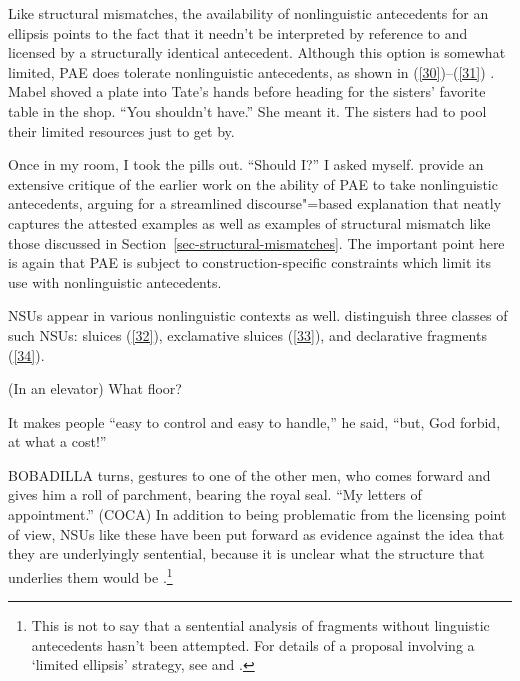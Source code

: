 {Like structural mismatches, the availability of nonlinguistic antecedents for an ellipsis points to the fact that it needn't be interpreted by reference to and licensed by a structurally identical antecedent. Although this option is somewhat limited, PAE does tolerate nonlinguistic antecedents, as shown in (\ref{30})--(\ref{31}) \citep[see also][]{Hankamer1976, Schachter1977}.
\ea Mabel shoved a plate into Tate's hands before heading for the sisters' favorite table in the shop. ``You shouldn't have.'' She meant it. The sisters had to pool their limited resources
just to get by. \citep[ex. 23][]{Miller2014b}\label{30}\z

\ea Once in my room, I took the pills out. ``Should I?'' I asked myself. \citep[ex. 22a][]{Miller2014b}\label{31}\z
\citet{Miller2014b} provide an extensive critique of the earlier work on the ability of PAE to take nonlinguistic antecedents, arguing for a streamlined discourse"=based explanation that neatly captures the attested examples as well as examples of structural mismatch like those discussed in Section~\ref{sec-structural-mismatches}. The important point here is again that PAE is subject to construction-specific constraints which limit its use with nonlinguistic antecedents.

NSUs appear in various nonlinguistic contexts as well. \citet{Ginzburg2018} distinguish three classes of such NSUs: sluices (\ref{32}), exclamative sluices (\ref{33}), and declarative fragments (\ref{34}).

\ea (In an elevator) What floor? \citep[298]{Ginzburg:Sag:2000}\label{32}\z

\ea It makes people ``easy to control and easy to handle,'' he said, ``but, God forbid, at what a cost!''
\label{33}\z

\ea BOBADILLA turns, gestures to one of the other men, who comes forward and gives him a roll of parchment, bearing the royal seal. ``My letters of appointment.'' (COCA)\label{34}\z
In addition to being problematic from the licensing point of view, NSUs like these have been put forward as evidence against the idea that they are underlyingly sentential, because it is unclear what the structure that underlies them would be \citep[see][]{Ginzburg:Sag:2000, CJ2005a, Stainton2006}.\footnote{This is not to say that a sentential analysis of fragments without linguistic antecedents hasn't been attempted. For details of a proposal involving a `limited ellipsis' strategy, see \citet{Merchant2005a} and \citet{Merchant2010}.}


}
